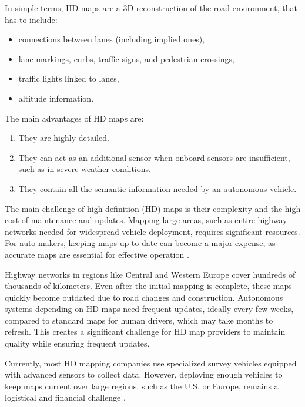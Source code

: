 In simple terms, HD maps are a 3D reconstruction of the road environment, that has to include:
\begin{itemize}
    \item connections between lanes (including implied ones),
    \item lane markings, curbs, traffic signs, and pedestrian crossings,
    \item traffic lights linked to lanes,
    \item altitude information.
\end{itemize}
The main advantages of HD maps are:
\begin{enumerate}
    \item They are highly detailed.
    \item They can act as an additional sensor when onboard sensors are insufficient, such as in severe weather conditions.
    \item They contain all the semantic information needed by an autonomous vehicle.
\end{enumerate}





The main challenge of high-definition (HD) maps is their complexity and the high cost of maintenance and updates. Mapping large areas, such as entire highway networks needed for widespread vehicle deployment, requires significant resources. For auto-makers, keeping maps up-to-date can become a major expense, as accurate maps are essential for effective operation \cite{gitlin2017detailedmaps}.

Highway networks in regions like Central and Western Europe cover hundreds of thousands of kilometers. Even after the initial mapping is complete, these maps quickly become outdated due to road changes and construction. Autonomous systems depending on HD maps need frequent updates, ideally every few weeks, compared to standard maps for human drivers, which may take months to refresh. This creates a significant challenge for HD map providers to maintain quality while ensuring frequent updates.

Currently, most HD mapping companies use specialized survey vehicles equipped with advanced sensors to collect data. However, deploying enough vehicles to keep maps current over large regions, such as the U.S. or Europe, remains a logistical and financial challenge \cite{dahlstrom2021hdmaps}.

